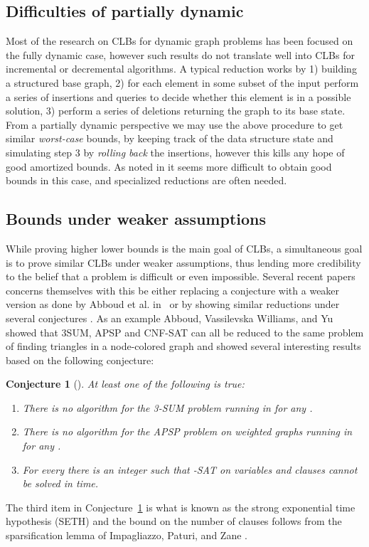 \documentclass[a4paper,11pt]{article}
\newtheorem{conjecture}{Conjecture}
\theoremstyle{definition}
\begin{document}
\subsection{Difficulties of partially dynamic}
Most of the research on CLBs for dynamic graph problems has been focused on the
fully dynamic case, however such results do not translate well into CLBs for
incremental or decremental algorithms. A typical reduction works by 1) building
a structured base graph, 2) for each element in some subset of the input
perform a series of insertions and queries to decide whether this element is in
a possible solution, 3) perform a series of deletions returning the graph to
its base state. From a partially dynamic perspective we may use the above
procedure to get similar \emph{worst-case} bounds, by keeping track of the data
structure state and simulating step 3 by \emph{rolling back} the insertions,
however this kills any hope of good amortized bounds. As noted in
\cite{AbboudV14,HenzingerKNS15,KopelowitzPP16} it seems more difficult to
obtain good bounds in this case, and specialized reductions are often
needed.

\subsection{Bounds under weaker assumptions}
While proving higher lower bounds is the main goal of CLBs, a simultaneous goal
is to prove similar CLBs under weaker assumptions, thus lending more credibility
to the belief that a problem is difficult or even impossible. Several recent
papers concerns themselves with this be either replacing a conjecture with a
weaker version as done by Abboud et al. in~\cite{AbboudHVW16} or by showing
similar reductions under several conjectures
\cite{VassilevskaW09,AbboudL13,AbboudVW14,AbboudVY15,HenzingerKNS15}.
As an example Abboud, Vassilevska Williams, and Yu~\cite{AbboudVY15} showed that
3SUM, APSP and CNF-SAT can all be reduced to the same problem of finding
triangles in a node-colored graph and showed several interesting results based
on the following conjecture:
\begin{conjecture}[\cite{AbboudVY15}]\label{conj:tc}
    At least one of the following is true:
    \begin{enumerate}
        \item There is no algorithm for the 3-SUM problem running in
             for any .
        \item There is no algorithm for the APSP problem on weighted graphs
            running in  for any .
        \item For every  there is an integer  such that
            -SAT on  variables and  clauses cannot be solved in
             time.
    \end{enumerate}
\end{conjecture}
The third item in Conjecture~\ref{conj:tc} is what is known as the strong
exponential time hypothesis (SETH) \cite{ImpagliazzoP01} and the  bound
on the number of clauses follows from the sparsification lemma of Impagliazzo,
Paturi, and Zane \cite{ImpagliazzoPZ01}.
\end{document}
